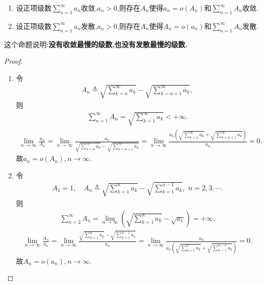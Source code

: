 \documentclass[../../main.tex]{subfiles}
\begin{document}
\begin{proposition}\label{proposition:没有收敛最慢的级数也没有发散最慢的级数}
\begin{enumerate}
\item 设正项级数$\sum\limits_{n=1}^\infty a_n$收敛,$a_n>0$,则存在$A_n$使得$a_n=o(A_n)$和$\sum\limits_{n=1}^\infty A_n$收敛.

\item 设正项级数$\sum\limits_{n=1}^\infty a_n$发散,$a_n>0$,则存在$A_n$使得$A_n=o(a_n)$和$\sum\limits_{n=1}^\infty A_n$发散.
\end{enumerate}
\end{proposition}
\begin{note}
这个命题说明:\textbf{没有收敛最慢的级数,也没有发散最慢的级数.}
\end{note}
\begin{proof}
\begin{enumerate}
\item 令
\begin{align*}
A_n\triangleq \sqrt{\sum_{k=n}^{\infty}{a_k}}-\sqrt{\sum_{k=n+1}^{\infty}{a_k}},
\end{align*}
则
\begin{align*}
\sum_{n=1}^{\infty}{A_n}=\sqrt{\sum_{k=1}^{\infty}{a_k}}<+\infty .
\end{align*}
\begin{align*}
\lim_{n\rightarrow \infty}\frac{a_n}{A_n}=\lim_{n\rightarrow \infty}\frac{a_n}{\sqrt{\sum\limits_{k=n}^{\infty}{a_k}}-\sqrt{\sum\limits_{k=n+1}^{\infty}{a_k}}}=\lim_{n\rightarrow \infty}\frac{a_n\left( \sqrt{\sum\limits_{k=n}^{\infty}{a_k}}+\sqrt{\sum\limits_{k=n+1}^{\infty}{a_k}} \right)}{a_n}=0.
\end{align*}
故$a_n=o\left( A_n \right) ,n\rightarrow \infty .$

\item 令
\begin{align*}
A_1=1,\quad A_n\triangleq \sqrt{\sum_{k=1}^n{a_k}}-\sqrt{\sum_{k=1}^{n-1}{a_k}},\,\,n=2,3,\cdots .
\end{align*}
则
\begin{align*}
\sum_{n=2}^{\infty}{A_n}=\lim_{n\rightarrow \infty}\left( \sqrt{\sum_{k=1}^n{a_k}}-\sqrt{a_1} \right) =+\infty .
\end{align*}
\begin{align*}
\lim_{n\rightarrow \infty}\frac{A_n}{a_n}=\lim_{n\rightarrow \infty}\frac{\sqrt{\sum\limits_{k=1}^n{a_k}}-\sqrt{\sum\limits_{k=1}^{n-1}{a_k}}}{a_n}=\lim_{n\rightarrow \infty}\frac{a_n}{a_n\left( \sqrt{\sum\limits_{k=1}^n{a_k}}+\sqrt{\sum\limits_{k=1}^{n-1}{a_k}} \right)}=0.
\end{align*}
故$A_n=o\left( a_n \right) ,n\rightarrow \infty .$
\end{enumerate}

\end{proof}
\end{document}
